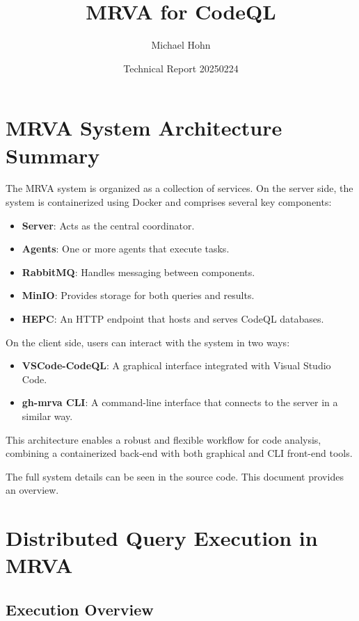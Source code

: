 \documentclass[11pt]{article}
\title{MRVA for CodeQL}
\author{Michael Hohn}
\date{Technical Report 20250224}
\begin{document}
\maketitle
\tableofcontents

\section{MRVA System Architecture Summary}

The MRVA system is organized as a collection of services. On the server side, the
system is containerized using Docker and comprises several key components:
\begin{itemize}
\item {\textbf{Server}}: Acts as the central coordinator.
\item \textbf{Agents}: One or more agents that execute tasks.
\item \textbf{RabbitMQ}: Handles messaging between components.
\item \textbf{MinIO}: Provides storage for both queries and results.
\item \textbf{HEPC}: An HTTP endpoint that hosts and serves CodeQL databases.
\end{itemize}

On the client side, users can interact with the system in two ways:
\begin{itemize}
\item {\textbf{VSCode-CodeQL}}: A graphical interface integrated with Visual Studio Code.
\item \textbf{gh-mrva CLI}: A command-line interface that connects to the server in a similar way.
\end{itemize}

This architecture enables a robust and flexible workflow for code analysis, combining a containerized back-end with both graphical and CLI front-end tools.

The full system details can be seen in the source code.  This document provides an
overview.

\section{Distributed Query Execution in MRVA}

\subsection{Execution Overview}
\end{document}
